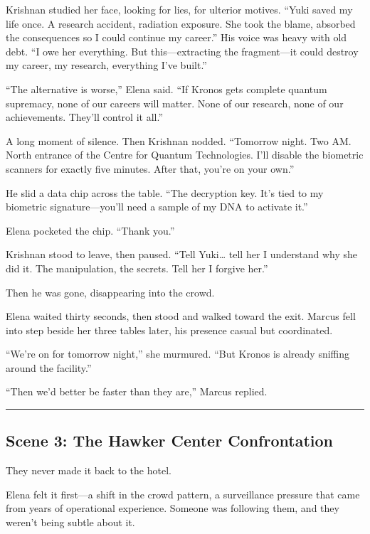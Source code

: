 \documentclass[12pt,letterpaper]{book}
\begin{document}
Krishnan studied her face, looking for lies, for ulterior motives. ``Yuki saved my life once. A research accident, radiation exposure. She took the blame, absorbed the consequences so I could continue my career.'' His voice was heavy with old debt. ``I owe her everything. But this---extracting the fragment---it could destroy my career, my research, everything I've built.''

``The alternative is worse,'' Elena said. ``If Kronos gets complete quantum supremacy, none of our careers will matter. None of our research, none of our achievements. They'll control it all.''

A long moment of silence. Then Krishnan nodded. ``Tomorrow night. Two AM. North entrance of the Centre for Quantum Technologies. I'll disable the biometric scanners for exactly five minutes. After that, you're on your own.''

He slid a data chip across the table. ``The decryption key. It's tied to my biometric signature---you'll need a sample of my DNA to activate it.''

Elena pocketed the chip. ``Thank you.''

Krishnan stood to leave, then paused. ``Tell Yuki\ldots{} tell her I understand why she did it. The manipulation, the secrets. Tell her I forgive her.''

Then he was gone, disappearing into the crowd.

Elena waited thirty seconds, then stood and walked toward the exit. Marcus fell into step beside her three tables later, his presence casual but coordinated.

``We're on for tomorrow night,'' she murmured. ``But Kronos is already sniffing around the facility.''

``Then we'd better be faster than they are,'' Marcus replied.

\begin{center}\rule{0.5\linewidth}{0.5pt}\end{center}

\hypertarget{scene-3-the-hawker-center-confrontation}{%
\subsection{Scene 3: The Hawker Center Confrontation}\label{scene-3-the-hawker-center-confrontation}}

They never made it back to the hotel.

Elena felt it first---a shift in the crowd pattern, a surveillance pressure that came from years of operational experience. Someone was following them, and they weren't being subtle about it.
\end{document}
